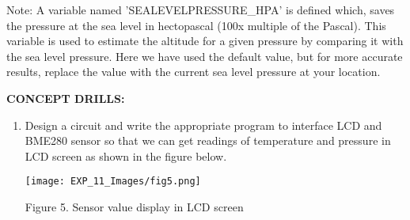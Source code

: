 \documentclass[12pt,a4paper]{article}
\begin{document}
\begin{justify} Note: A variable named 'SEALEVELPRESSURE\_HPA' is defined which, saves the pressure at the sea level in hectopascal (100x multiple of the Pascal). This variable is used to estimate the altitude for a given pressure by comparing it with the sea level pressure. Here we have used the default value, but for more accurate results, replace the value with the current sea level pressure at your location.

\setlength{\parindent}{0eM}

\textbf{\large CONCEPT DRILLS:}
\vspace{-6mm}
\begin{enumerate}
 \setlength\itemsep{-0.3em}
\item Design a circuit and write the appropriate program to interface LCD and BME280 sensor so that we can get readings of temperature and pressure in LCD screen as shown in the figure below.


\begin{center} 
\texttt{[image: EXP\_11\_Images/fig5.png]}
\end{center}
\begin{center} {Figure 5. Sensor value display in LCD screen}\end{center}
\end{enumerate}
\end{justify}
\end{document}
